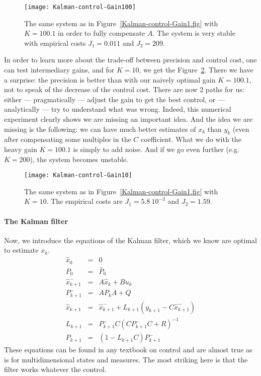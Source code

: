 \begin{figure}[htb]
	\centering
	\texttt{[image: Kalman-control-Gain100]}       
	\caption{The same system as in Figure~\ref{Kalman-control-Gain1.fig} with $K=100.1$ in order to fully compensate $A$. The system is very stable with empirical costs $J_1=0.011$ and  $J_2=209$.}
	\label{Kalman-control-Gain100.fig}
\end{figure}

In order to learn more about the trade-off between precision and control cost, one can test intermediary gains, and for $K=10$, we get the Figure~\ref{Kalman-control-Gain10.fig}. There we have a surprise: the precision is better than with our naively optimal gain $K=100.1$, not to speak of the decrease of the control cost. There are now 2 paths for us: either --- pragmatically --- adjust the gain to get the best control, or --- analytically --- try to understand what was wrong. Indeed, this numerical experiment clearly shows we are missing an important idea. And the idea we are missing is the following: we can have much better estimates of $x_k$ than $y_k$ (even after compensating some multiples in the $C$ coefficient. What we do with the heavy gain $K=100.1$ is simply to add noise. And if we go even further (e.g. $K=200$), the system becomes unstable.

\begin{figure}[htb]
	\centering
	\texttt{[image: Kalman-control-Gain10]}       
	\caption{The same system as in Figure~\ref{Kalman-control-Gain1.fig} with $K=10$. The empirical costs are $J_1=5.8\ 10^{-3}$ and  $J_2=1.59$.}
	\label{Kalman-control-Gain10.fig}
\end{figure}

\paragraph{The Kalman filter}
Now, we introduce the equations of the Kalman filter, which we know are optimal to estimate $x_k$.
\begin{eqnarray}
\label{kalman-filter.eq1}
\hat{x}_0 &=& 0\\
\label{kalman-filter.eq2}
P_0 &=& \bar{P}_0\\
\label{kalman-filter.eq3}
\hat{x}^-_{k+1} &=& A \hat{x}_k + B u_k\\
\label{kalman-filter.eq4}
P^-_{k+1} &=& A P_k A + Q\\
\label{kalman-filter.eq5}
\hat{x}_{k+1} &=& \hat{x}^-_{k+1} + L_{k+1}\left(y_{k+1}-C\hat{x}^-_{k+1}\right)\\
\label{kalman-filter.eq6}
L_{k+1} &=& P^-_{k+1}C\left(CP^-_{k+1}C+R\right)^{-1}\\
\label{kalman-filter.eq7}
P_{k+1} &=& \left(1-L_{k+1}C\right)P^-_{k+1}
\end{eqnarray}
These equations can be found in any textbook on control and are almost true as is for multidimensional states and measures. The most striking here is that the filter works whatever the control.

